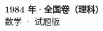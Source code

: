 \documentclass[zihao=-4, a4paper]{ctexart}
\begin{document}
\begin{center}
  {\Large\bfseries 1984 年·全国卷（理科）}\\[4pt]
  {\large 数学 · 试题版}
\end{center}
\medskip
{}

\end{document}
